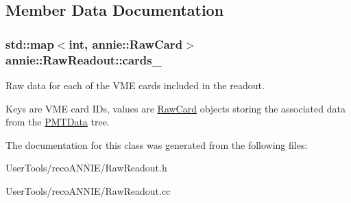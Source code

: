 \subsection{Member Data Documentation}
\hypertarget{classannie_1_1RawReadout_a7326e38c87830bfc38205850fa557d8c}{
\subsubsection[{cards\-\_\-}]{\setlength{\rightskip}{0pt plus 5cm}std\-::map$<$int, {\bf annie\-::\-Raw\-Card}$>$ annie\-::\-Raw\-Readout\-::cards\-\_\-\hspace{0.3cm}{\ttfamily [protected]}}}\label{classannie_1_1RawReadout_a7326e38c87830bfc38205850fa557d8c}


Raw data for each of the V\-M\-E cards included in the readout. 

Keys are V\-M\-E card I\-Ds, values are \hyperlink{classannie_1_1RawCard}{Raw\-Card} objects storing the associated data from the \hyperlink{classPMTData}{P\-M\-T\-Data} tree. 

The documentation for this class was generated from the following files\-:\begin{DoxyCompactItemize}
\item 
User\-Tools/reco\-A\-N\-N\-I\-E/Raw\-Readout.\-h\item 
User\-Tools/reco\-A\-N\-N\-I\-E/Raw\-Readout.\-cc\end{DoxyCompactItemize}
